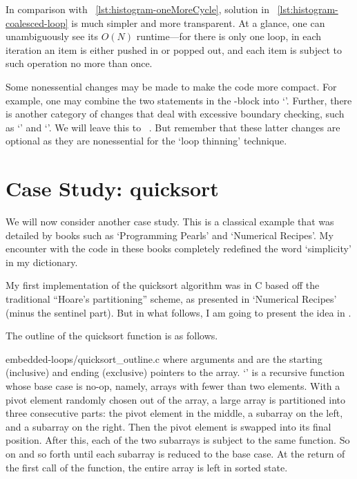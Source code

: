 In comparison with ~\autoref{lst:histogram-oneMoreCycle}, solution in
~\autoref{lst:histogram-coalesced-loop} is much simpler and more transparent.
At a glance, one can unambiguously see its $O(N)$ runtime---for there is only one loop,
in each iteration an item is either pushed in or popped out,
and each item is subject to such operation no more than once.


Some nonessential changes may be made to make the code more compact.
For example, one may combine the two statements in the -block into
`'.
Further, there is another category of changes that deal with excessive boundary checking,
such as
`' and `'.
We will leave this to ~.
But remember that these latter changes are optional
as they are nonessential for the `loop thinning' technique.


\section{Case Study: quicksort}\label{sec:nested-loop-quick-sort}

We will now consider another case study.
This is a classical example that was detailed by books such as `Programming
Pearls' and `Numerical Recipes'\cite{Bentley:1986:PP, NumericalRecipes:1992}.
My encounter with the code in these books completely redefined the word `simplicity'
in my dictionary.


My first implementation of the quicksort algorithm was in C based off
the traditional ``Hoare's partitioning'' scheme, as presented
in `Numerical Recipes' (minus the sentinel part).
But in what follows, I am going to present the idea in \python.


The outline of the quicksort function is as follows.

{embedded-loops/quicksort_outline.c}
where arguments  and  are the starting (inclusive) and ending (exclusive) pointers
to the array.
`' is a recursive function whose base case is no-op, namely,
arrays with fewer than two elements.
With a pivot element randomly chosen out of the array,
a large array is partitioned into three consecutive parts: the pivot element in the middle, a
subarray on the left, and a subarray on the right.
Then the pivot element is swapped into its final position.
After this, each of the two subarrays is subject to the same function.
So on and so forth until each subarray is reduced to the base case.
At the return of the first call of the function, the entire array is left in sorted state.


